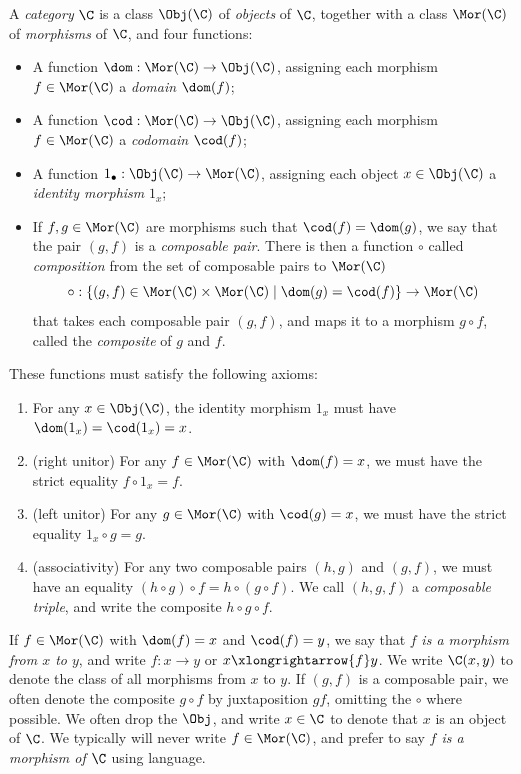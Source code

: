 \begin{definition}\label{A.1.1}
    A \emph{category} $\C$ is a class $\Obj(\C)$ of \emph{objects} of $\C$, together with a class $\Mor(\C)$ of \emph{morphisms} of $\C$, and four functions:
    \begin{itemize}
        \item A function $\dom : \Mor(\C) \to \Obj(\C)$, assigning each morphism $f\in\Mor(\C)$ a \emph{domain} $\dom(f)$;
        \item A function $\cod : \Mor(\C)\to\Obj(\C)$, assigning each morphism $f\in\Mor(\C)$ a \emph{codomain} $\cod(f)$;
        \item A function $1_\bullet : \Obj(\C)\to\Mor(\C)$, assigning each object $x\in\Obj(\C)$ a \emph{identity morphism} $1_x$;
        \item If $f,g\in\Mor(\C)$ are morphisms such that $\cod(f)=\dom(g)$, we say that the pair $(g,f)$ is a \emph{composable pair}. There is then a function $\circ$ called \emph{composition} from the set of composable pairs to $\Mor(\C)$
        \[
        \circ : \{(g,f)\in\Mor(\C)\times\Mor(\C) \mid \dom(g)=\cod(f)\} \to \Mor(\C)
        \]
        that takes each composable pair $(g,f)$, and maps it to a morphism $g\circ f$, called the \emph{composite} of $g$ and $f$.
    \end{itemize}
    These functions must satisfy the following axioms:
    \begin{enumerate}
        \item For any $x\in\Obj(\C)$, the identity morphism $1_x$ must have $\dom(1_x)=\cod(1_x)=x$.
        \item (right unitor) For any $f\in\Mor(\C)$ with $\dom(f)=x$, we must have the strict equality $f\circ 1_x = f$.
        \item (left unitor) For any $g\in\Mor(\C)$ with $\cod(g)=x$, we must have the strict equality $1_x\circ g= g$.
        \item (associativity) For any two composable pairs $(h,g)$ and $(g,f)$, we must have an equality $(h\circ g)\circ f=h\circ(g\circ f)$. We call $(h,g,f)$ a \emph{composable triple}, and write the composite $h\circ g\circ f$.
    \end{enumerate}
\end{definition}

\begin{notation}\label{A.1.2}
    If $f\in\Mor(\C)$ with $\dom(f)=x$ and $\cod(f)=y$, we say that $f$ \emph{is a morphism from $x$ to $y$}, and write $f : x \to y$ or $x\xlongrightarrow{f} y$. We write $\C(x,y)$ to denote the class of all morphisms from $x$ to $y$. If $(g,f)$ is a composable pair, we often denote the composite $g\circ f$ by juxtaposition $gf$, omitting the $\circ$ where possible. We often drop the $\Obj$, and write $x\in\C$ to denote that $x$ is an object of $\C$. We typically will never write $f\in\Mor(\C)$, and prefer to say \emph{$f$ is a morphism of $\C$} using language.
\end{notation}

